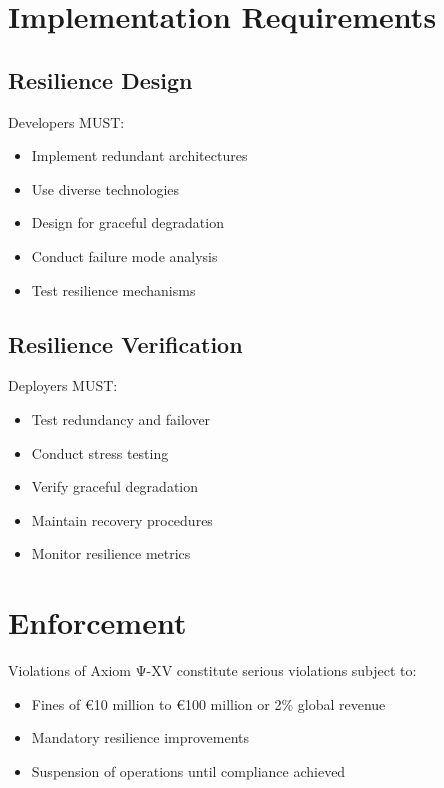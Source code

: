 \vspace{0.5cm}

\section{Implementation Requirements}

\subsection{Resilience Design}

Developers MUST:

\begin{itemize}
    \item Implement redundant architectures
    \item Use diverse technologies
    \item Design for graceful degradation
    \item Conduct failure mode analysis
    \item Test resilience mechanisms
\end{itemize}

\subsection{Resilience Verification}

Deployers MUST:

\begin{itemize}
    \item Test redundancy and failover
    \item Conduct stress testing
    \item Verify graceful degradation
    \item Maintain recovery procedures
    \item Monitor resilience metrics
\end{itemize}

\vspace{0.5cm}

\section{Enforcement}

Violations of Axiom Ψ-XV constitute serious violations subject to:

\begin{itemize}
    \item Fines of €10 million to €100 million or 2\% global revenue
    \item Mandatory resilience improvements
    \item Suspension of operations until compliance achieved
\end{itemize}

